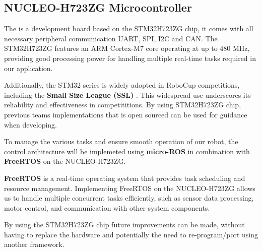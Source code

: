 \documentclass[a4paper,8pt]{article}
\begin{document}
\subsection{NUCLEO-H723ZG Microcontroller}

The  is a development board based on the
STM32H723ZG chip, it comes with all necessary peripheral communication
UART, SPI, I2C and CAN. The STM32H723ZG features an ARM Cortex-M7 core
operating at up to 480 MHz, providing good processing power for
handling multiple real-time tasks required in our application.

Additionally, the STM32 series is widely adopted in RoboCup
competitions, including the \textbf{Small Size League (SSL)} \cite{ryllExtendedTeamDescription}\cite{zhaoZJUNlictExtendedTeam}\cite{wuCompilationErrorTeam}.
This widespread use underscores its reliability and effectiveness in
competititions. By using STM32H723ZG chip, previous teams implementations that is open sourced can be used for guidance when developing.

To manage the various tasks and ensure smooth operation of our robot,
the control architecture will be implemeted using \textbf{micro-ROS} in
combination with \textbf{FreeRTOS} on the NUCLEO-H723ZG.

\textbf{FreeRTOS} is a real-time operating system that provides task
scheduling and resource management. Implementing FreeRTOS on the
NUCLEO-H723ZG allows us to handle multiple concurrent tasks
efficiently, such as sensor data processing, motor control, and
communication with other system components.

By using the STM32H723ZG chip future improvements can be made, without having to replace the hardware and potentially the need to re-program/port using another framework.

%
%
%
%
\end{document}
